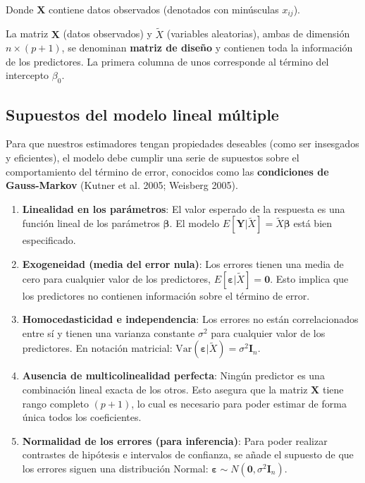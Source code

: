 \documentclass[
  letterpaper,
  DIV=11,
  numbers=noendperiod]{scrreprt}
\begin{document}
Donde \(\mathbf{X}\) contiene datos observados (denotados con minúsculas
\(x_{ij}\)).

La matriz \(\mathbf{X}\) (datos observados) y \(\tilde{X}\) (variables
aleatorias), ambas de dimensión \(n \times (p+1)\), se denominan
\textbf{matriz de diseño} y contienen toda la información de los
predictores. La primera columna de unos corresponde al término del
intercepto \(\beta_0\).

\subsection{Supuestos del modelo lineal
múltiple}\label{supuestos-del-modelo-lineal-muxfaltiple}

Para que nuestros estimadores tengan propiedades deseables (como ser
insesgados y eficientes), el modelo debe cumplir una serie de supuestos
sobre el comportamiento del término de error, conocidos como las
\textbf{condiciones de Gauss-Markov} (Kutner et al. 2005; Weisberg
2005).

\begin{enumerate}
\def\labelenumi{\arabic{enumi}.}
\item
  \textbf{Linealidad en los parámetros}: El valor esperado de la
  respuesta es una función lineal de los parámetros
  \(\boldsymbol{\beta}\). El modelo
  \(E[\mathbf{Y}|\tilde{X}] = \tilde{X}\boldsymbol{\beta}\) está bien
  especificado.
\item
  \textbf{Exogeneidad (media del error nula)}: Los errores tienen una
  media de cero para cualquier valor de los predictores,
  \(E[\boldsymbol{\varepsilon}|\tilde{X}] = \mathbf{0}\). Esto implica
  que los predictores no contienen información sobre el término de
  error.
\item
  \textbf{Homocedasticidad e independencia}: Los errores no están
  correlacionados entre sí y tienen una varianza constante \(\sigma^2\)
  para cualquier valor de los predictores. En notación matricial:
  \(\text{Var}(\boldsymbol{\varepsilon}|\tilde{X}) = \sigma^2\mathbf{I}_n\).
\item
  \textbf{Ausencia de multicolinealidad perfecta}: Ningún predictor es
  una combinación lineal exacta de los otros. Esto asegura que la matriz
  \(\mathbf{X}\) tiene rango completo \((p+1)\), lo cual es necesario
  para poder estimar de forma única todos los coeficientes.
\item
  \textbf{Normalidad de los errores (para inferencia)}: Para poder
  realizar contrastes de hipótesis e intervalos de confianza, se añade
  el supuesto de que los errores siguen una distribución Normal:
  \(\boldsymbol{\varepsilon} \sim N(\mathbf{0}, \sigma^2\mathbf{I}_n)\).
\end{enumerate}
\end{document}
